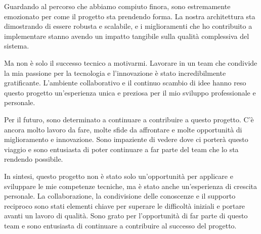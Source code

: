 \documentclass[target=bach,aauheader=,style=]{thud}
\begin{document}
Guardando al percorso che abbiamo compiuto finora, sono estremamente emozionato per come il progetto sta prendendo forma. La nostra architettura sta dimostrando di essere robusta e scalabile, e i miglioramenti che ho contribuito a implementare stanno avendo un impatto tangibile sulla qualità complessiva del sistema.

Ma non è solo il successo tecnico a motivarmi. Lavorare in un team che condivide la mia passione per la tecnologia e l'innovazione è stato incredibilmente gratificante. L'ambiente collaborativo e il continuo scambio di idee hanno reso questo progetto un'esperienza unica e preziosa per il mio sviluppo professionale e personale.

Per il futuro, sono determinato a continuare a contribuire a questo progetto. C'è ancora molto lavoro da fare, molte sfide da affrontare e molte opportunità di miglioramento e innovazione. Sono impaziente di vedere dove ci porterà questo viaggio e sono entusiasta di poter continuare a far parte del team che lo sta rendendo possibile.

In sintesi, questo progetto non è stato solo un'opportunità per applicare e sviluppare le mie competenze tecniche, ma è stato anche un'esperienza di crescita personale. La collaborazione, la condivisione delle conoscenze e il supporto reciproco sono stati elementi chiave per superare le difficoltà iniziali e portare avanti un lavoro di qualità. Sono grato per l'opportunità di far parte di questo team e sono entusiasta di continuare a contribuire al successo del progetto.



\end{document}
